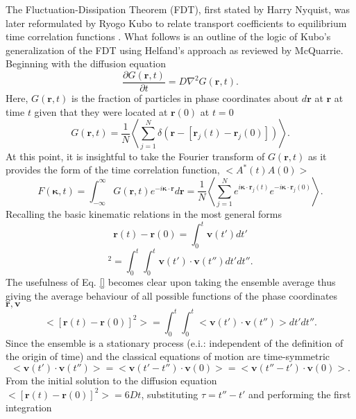The Fluctuation-Dissipation Theorem (FDT), first stated by Harry Nyquist, was later reformulated by Ryogo Kubo to relate transport coefficients to equilibrium time correlation functions \cite{JPSJ.12.570}. What follows is an outline of the logic of Kubo's generalization of the FDT using Helfand's approach as reviewed by McQuarrie\cite{mcquarrie}. Beginning with the diffusion equation
%
\begin{equation}
\frac{\partial G(\bm{r},t)}{\partial t}= D \nabla ^2G(\bm{r},t).
\end{equation}
%
Here, $G(\bm{r},t)$ is the fraction of particles in phase coordinates about $d\bm{r}$ at $\bm{r}$ at time $t$ given that they were located at $\bm{r}(0)$ at $t=0$
%
\begin{equation}
G(\bm{r},t)= \frac{1}{N}\left<\sum_{j=1}^N\delta(\bm{r}-[\bm{r}_j(t)-\bm{r}_j(0)])\right>.
\end{equation}
%
At this point, it is insightful to take the Fourier transform of $G(\bm{r},t)$ as it provides the form of the time correlation function, $<A^*(t)A(0)>$
%
\begin{equation}
F(\bm{\kappa},t)=\int_{-\infty}^{\infty}G(\bm{r},t)e^{-i\bm{\kappa}\cdot\bm{r}}d\bm{r}=\frac{1}{N}\left<\sum_{j=1}^Ne^{i\bm{\kappa}\cdot\bm{r}_j(t)}e^{-i\bm{\kappa}\cdot\bm{r}_j(0)}\right>.
\end{equation}
%
Recalling the basic kinematic relations in the most general forms
%
\begin{equation}
\bm{r}(t)-\bm{r}(0)=\int_0^t \bm{v}(t')dt'
\end{equation}
\begin{equation}
[\bm{r}(t)-\bm{r}(0)]^2=\int_0^t \int_0^t \bm{v}(t')\cdot\bm{v}(t'')dt'dt''.
\end{equation}
%
The usefulness of Eq. \ref {} becomes clear upon taking the ensemble average thus giving the average behaviour of all possible functions of the phase coordinates $\bm{r},\bm{v}$
%
\begin{equation}
<[\bm{r}(t)-\bm{r}(0)]^2>=\int_0^t \int_0^t <\bm{v}(t')\cdot\bm{v}(t'')>dt'dt''.
\end{equation}
%
Since the ensemble is a stationary process (e.i.: independent of the definition of the origin of time) and the classical equations of motion are time-symmetric
%
\begin{equation}
<\bm{v}(t')\cdot\bm{v}(t'')>=<\bm{v}(t'-t'')\cdot\bm{v}(0)>=<\bm{v}(t''-t')\cdot\bm{v}(0)>.
\end{equation}
%
From the initial solution to the diffusion equation $<[\bm{r}(t)-\bm{r}(0)]^2>=6Dt$, substituting $\tau=t''-t'$ and performing the first integration
